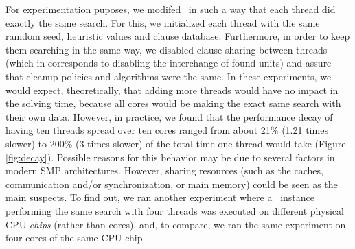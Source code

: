 For experimentation puposes, we modifed \pling\ in such a way that
each thread did exactly the same search. For this, we initialized each
thread with the same ramdom seed, heuristic values and clause
database.  Furthermore, in order to keep them searching in the same
way, we disabled clause sharing between threads (which in \pling
corresponds to disabling the interchange of found units) and assure
that cleanup policies and algorithms were the same. In these
experiments, we would expect, theoretically, that adding more threads
would have no impact in the solving time, because all cores would be
making the exact same search with their own data. However, in
practice, we found that the performance decay of having ten threads
spread over ten cores ranged from about 21\% (1.21 times slower) to
200\% (3 times slower) of the total time one thread would take (Figure
\ref{fig:decay}). Possible reasons for this behavior may be due to
several factors in modern SMP architectures. However, sharing
resources (such as the caches, communication and/or synchronization,
or main memory) could be seen as the main suspects. To find out, we
ran another experiment where a \pling\ instance performing the same
search with four threads was executed on different physical CPU {\em
  chips} (rather than cores), and, to compare, we ran the same
experiment on four cores of the same CPU chip.


